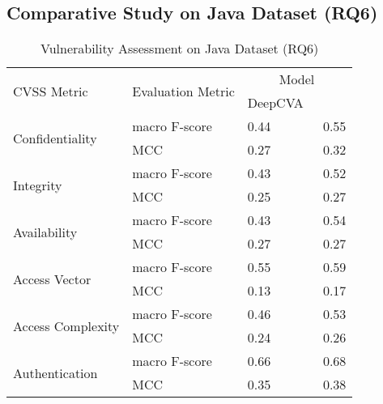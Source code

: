\subsection{\bf Comparative Study on Java Dataset (RQ6)}

\begin{table}[t]
	\caption{Vulnerability Assessment on Java Dataset (RQ6)}
        \vspace{-9pt}
	\begin{center}
        \tabcolsep 2.5pt
\small
		\renewcommand{\arraystretch}{1}
		\begin{tabular}{l|p{2.0cm}<{\centering}|p{1.6cm}<{\centering}|p{1.5cm}<{\centering}}
			\hline
			\multirow{2}{*}{CVSS Metric}     & \multirow{2}{*}{Evaluation Metric}  & \multicolumn{2}{c}{Model}\\
			\cline{3-4}
			&                                     & DeepCVA~\cite{deepCVA-ase21}    & \tool       \\
			\hline
			\multirow{2}{*}{Confidentiality} & macro F-score                             &     0.44       & 0.55\\
			\cline{2-4}
			& MCC                                 &      0.27      & 0.32\\
			\hline
			\multirow{2}{*}{Integrity}       & macro F-score                             &    0.43        & 0.52\\
			\cline{2-4}
			& MCC                                 &    0.25        & 0.27\\
			\hline
			\multirow{2}{*}{Availability}    & macro F-score                             &   0.43         & 0.54\\
			\cline{2-4}
			& MCC                                 &    0.27        & 0.27\\
			\hline
			\multirow{2}{*}{Access Vector}   & macro F-score                             &   0.55         & 0.59\\
			\cline{2-4}
			& MCC                                 &    0.13        & 0.17\\
			\hline
			\multirow{2}{*}{Access Complexity} & macro F-score                           &   0.46         & 0.53\\
			\cline{2-4}
			& MCC                                 &    0.24        & 0.26\\
			\hline
			\multirow{2}{*}{Authentication}  & macro F-score                             &   0.66         & 0.68\\
			\cline{2-4}
			& MCC                                 &   0.35         & 0.38\\

\end{tabular}
\end{center}
\end{table}
